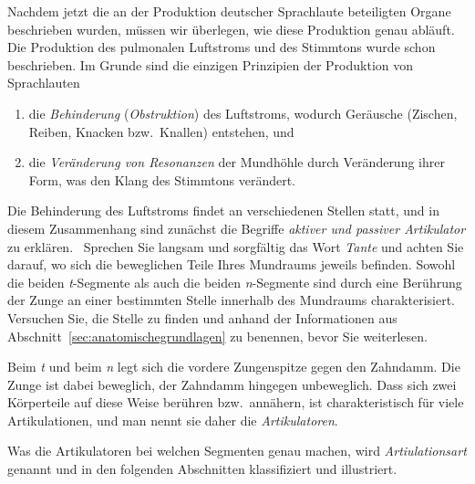Nachdem jetzt die an der Produktion deutscher Sprachlaute beteiligten Organe beschrieben wurden, müssen wir überlegen, wie diese Produktion genau abläuft.
Die Produktion des pulmonalen Luftstroms und des Stimmtons wurde schon beschrieben.
Im Grunde sind die einzigen Prinzipien der Produktion von Sprachlauten

\begin{enumerate}\Lf
  \item die \textit{Behinderung} (\textit{Obstruktion}) des Luftstroms, wodurch Geräusche (Zischen, Reiben, Knacken bzw.\ Knallen) entstehen, und
  \item die \textit{Veränderung von Resonanzen} der Mundhöhle durch Veränderung ihrer Form, was den Klang des Stimmtons verändert.
\end{enumerate}

Die Behinderung des Luftstroms findet an verschiedenen Stellen statt, und in diesem Zusammenhang sind zunächst die Begriffe \textit{aktiver und passiver Artikulator} zu erklären.
\TuBegin~Sprechen Sie langsam und sorgfältig das Wort \textit{Tante} und achten Sie darauf, wo sich die beweglichen Teile Ihres Mundraums jeweils befinden.
Sowohl die beiden \textit{t}-Segmente als auch die beiden \textit{n}-Segmente sind durch eine Berührung der Zunge an einer bestimmten Stelle innerhalb des Mundraums charakterisiert.
Versuchen Sie, die Stelle zu finden und anhand der Informationen aus Abschnitt~\ref{sec:anatomischegrundlagen} zu benennen, bevor Sie weiterlesen.

Beim \textit{t} und beim \textit{n} legt sich die vordere Zungenspitze gegen den Zahndamm.
Die Zunge ist dabei beweglich, der Zahndamm hingegen unbeweglich.
Dass sich zwei Körperteile auf diese Weise berühren bzw.\ annähern, ist charakteristisch für viele Artikulationen, und man nennt sie daher die \textit{Artikulatoren}.


Was die Artikulatoren bei welchen Segmenten genau machen, wird \textit{Artiulationsart} genannt und in den folgenden Abschnitten klassifiziert und illustriert.


